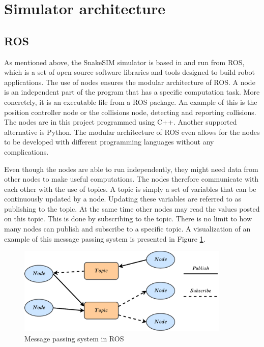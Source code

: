 \section{Simulator architecture}\label{sec:sim_architecture}

\subsection{ROS}

As mentioned above, the SnakeSIM simulator is based in and run from ROS, which is a set of open source software libraries and tools designed to build robot applications.
The use of nodes ensures the modular architecture of ROS. A node is an independent part of the program that has a specific computation task. More concretely, it is an executable file from a ROS package. An example of this is the position controller node or the collisions node, detecting and reporting collisions. The nodes are in this project programmed using C++. Another supported alternative is Python. The modular architecture of ROS even allows for the nodes to be developed with different programming languages without any complications.

Even though the nodes are able to run independently, they might need data from other nodes to make useful computations. The nodes therefore communicate with each other with the use of topics. A topic is simply a set of variables that can be continuously updated by a node. Updating these variables are referred to as publishing to the topic. At the same time other nodes may read the values posted on this topic. This is done by subscribing to the topic. There is no limit to how many nodes can publish and subscribe to a specific topic. A visualization of an example of this message passing system is presented in Figure \ref{fig:nodesntopics}.

\begin{figure}
    \centering
    \includegraphics[width=0.9\textwidth]{figures/simulator/nodesntopics.pdf}
    \caption{Message passing system in ROS}
    \label{fig:nodesntopics}
\end{figure}

